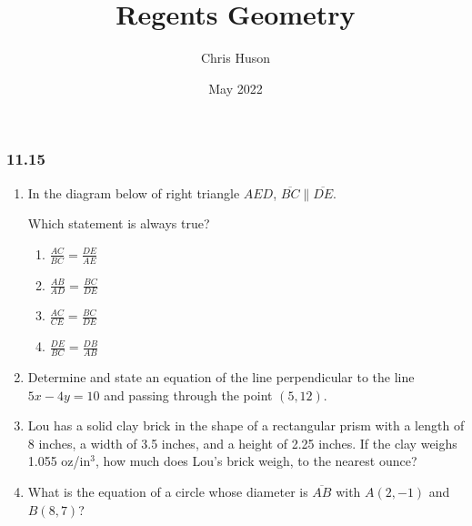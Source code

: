 \documentclass[12pt, oneside]{article}
\title{Regents Geometry}
\author{Chris Huson}
\date{May 2022}
\begin{document}
\subsubsection*{11.15 }
\begin{enumerate}[itemsep=1.2cm]
\item In the diagram below of right triangle $AED$, $\overline{BC} \parallel \overline{DE}$.
    \begin{center}
    \end{center} 
    Which statement is always true?
    \begin{multicols}{2}
      \begin{enumerate}[itemsep=0.25cm]
        \item $\displaystyle \frac{AC}{BC} = \frac{DE}{AE}$
        \item $\displaystyle \frac{AB}{AD} = \frac{BC}{DE}$ 
        \item $\displaystyle \frac{AC}{CE} = \frac{BC}{DE}$
        \item $\displaystyle \frac{DE}{BC} = \frac{DB}{AB}$
      \end{enumerate}
    \end{multicols}

\item Determine and state an equation of the line perpendicular to the line\\ $5x-4y=10$ and passing through the point $(5,12)$.

\item Lou has a solid clay brick in the shape of a rectangular prism with a length of 8 inches, a width of 3.5 inches, and a height of 2.25 inches. If the clay weighs 1.055 oz/in$^3$, how much does Lou's brick weigh, to the nearest ounce?

\item What is the equation of a circle whose diameter is $\overline{AB}$ with $A(2,-1)$ and $B(8,7)$?
    \begin{flushright}
    \end{flushright}


\end{enumerate}
\end{document}
